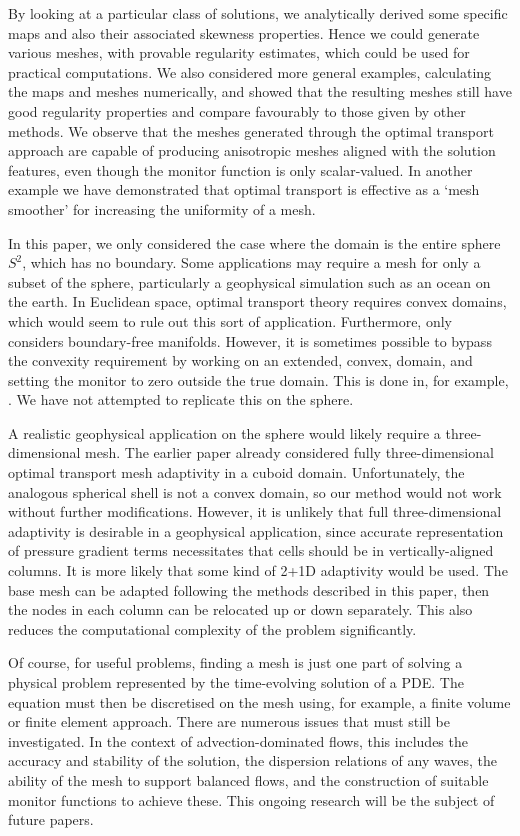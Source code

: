 \documentclass[11pt, a4paper]{scrartcl}  %
\theoremstyle{plain}
\theoremstyle{definition}
\numberwithin{equation}{section}
\begin{document}
By looking at a particular class of solutions, we analytically derived
some specific maps and also their associated skewness properties. Hence
we could generate various meshes, with provable regularity estimates,
which could be used for practical computations. We also considered more
general examples, calculating the maps and meshes numerically, and
showed that the resulting meshes still have good regularity properties
and compare favourably to those given by other methods. We
observe that the meshes generated through the optimal transport approach
are capable of producing anisotropic meshes aligned with the solution
features, even though the monitor function is only scalar-valued. In
another example we have demonstrated that optimal transport is effective
as a `mesh smoother' for increasing the uniformity of a mesh.

In this paper, we only considered the case where the domain is the
entire sphere $S^2$, which has no boundary. Some applications may
require a mesh for only a subset of the sphere, particularly a
geophysical simulation such as an ocean on the earth. In Euclidean
space, optimal transport theory requires convex domains, which would
seem to rule out this sort of application. Furthermore,
\citet{mccann2001polar} only considers boundary-free manifolds. However,
it is sometimes possible to bypass the convexity requirement by working
on an extended, convex, domain, and setting the monitor to zero outside
the true domain. This is done in, for example,
\citet{benamou2014numerical}. We have not attempted to replicate this
on the sphere.

A realistic geophysical application on the sphere would likely require
a three-dimensional mesh. The earlier paper \citet{browne2014fast}
already considered fully three-dimensional optimal transport mesh
adaptivity in a cuboid domain. Unfortunately, the analogous spherical
shell is not a convex domain, so our method would not work without
further modifications. However, it is unlikely that full three-dimensional
adaptivity is desirable in a geophysical application, since accurate
representation of pressure gradient terms necessitates that cells should
be in vertically-aligned columns. It is more likely that some kind of
2+1D adaptivity would be used. The base mesh can be adapted following
the methods described in this paper, then the nodes in each column can
be relocated up or down separately. This also reduces the computational
complexity of the problem significantly.

Of course, for useful problems, finding a mesh is just one part of
solving a physical problem represented by the time-evolving solution of
a PDE. The equation must then be discretised on the mesh using, for
example, a finite volume or finite element approach. There are numerous
issues that must still be investigated. In the context of
advection-dominated flows, this includes the accuracy and stability of
the solution, the dispersion relations of any waves, the ability of the
mesh to support balanced flows, and the construction of suitable monitor
functions to achieve these. This ongoing research will be the subject of
future papers.
\end{document}
